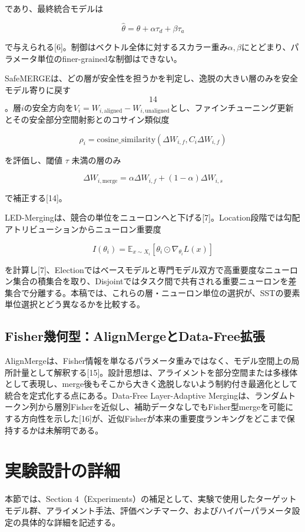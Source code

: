 \documentclass{article}
\begin{document}
であり、最終統合モデルは

\[
\hat\theta=\theta+\alpha\tau_d+\beta\tau_a
\tag{9}
\]

で与えられる[6]。制御はベクトル全体に対するスカラー重み\(\alpha,\beta\)にとどまり、パラメータ単位のfiner-grainedな制御はできない。

SafeMERGEは、どの層が安全性を担うかを判定し、逸脱の大きい層のみを安全モデル寄りに戻す\[14\]。層\(i\)の安全方向を\(V_i=W_{i,\mathrm{aligned}}-W_{i,\mathrm{unaligned}}\)とし、ファインチューニング更新とその安全部分空間射影とのコサイン類似度

\[
\rho_i=\mathrm{cosine\_similarity}(\Delta W_{i,f},C_i\Delta W_{i,f})
\tag{10}
\]

を評価し、閾値 \(\tau\) 未満の層のみ

\[
\Delta W_{i,\mathrm{merge}}=\alpha\Delta W_{i,f}+(1-\alpha)\Delta W_{i,s}
\tag{11}
\]

で補正する[14]。

LED-Mergingは、競合の単位をニューロンへと下げる[7]。Location段階では勾配アトリビューションからニューロン重要度

\[
I(\theta_i)=\mathbb{E}_{x\sim X_i}[\theta_i\odot\nabla_{\theta_i}L(x)]
\tag{12}
\]

を計算し[7]、Electionではベースモデルと専門モデル双方で高重要度なニューロン集合の積集合を取り、Disjointではタスク間で共有される重要ニューロンを差集合で分離する。本稿では、これらの層・ニューロン単位の選択が、SSTの要素単位選択とどう異なるかを比較する。

\subsection{Fisher幾何型：AlignMergeとData-Free拡張}

AlignMergeは、Fisher情報を単なるパラメータ重みではなく、モデル空間上の局所計量として解釈する[15]。設計思想は、アライメントを部分空間または多様体として表現し、merge後もそこから大きく逸脱しないよう制約付き最適化として統合を定式化する点にある。Data-Free Layer-Adaptive Mergingは、ランダムトークン列から層別Fisherを近似し、補助データなしでもFisher型mergeを可能にする方向性を示した[16]が、近似Fisherが本来の重要度ランキングをどこまで保持するかは未解明である。

\section{実験設計の詳細}
本節では、Section 4（Experiments）の補足として、実験で使用したターゲットモデル群、アライメント手法、評価ベンチマーク、およびハイパーパラメータ設定の具体的な詳細を記述する。
\end{document}
